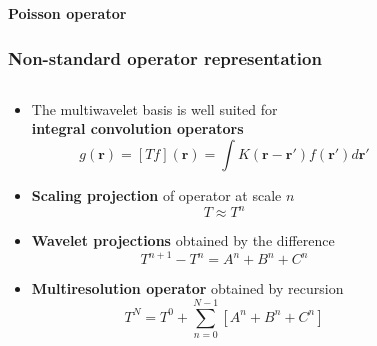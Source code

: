 \begin{frame}
    \centering
    \textbf{\Large{Poisson operator}}
\end{frame}

\begin{frame}
    \frametitle{Non-standard operator representation}
    \tiny
    \begin{columns}
    \begin{column}[b]{0.5\linewidth}
    \begin{itemize}
	\item	The multiwavelet basis is well suited for\\ 
        \textbf{integral convolution operators}
	    \begin{equation}
		\nonumber
		g(\boldsymbol{r}) = \left[T f\right](\boldsymbol{r}) = 
		    \int K(\boldsymbol{r} - \boldsymbol{r'})f(\boldsymbol{r'}) d\boldsymbol{r'}
	    \end{equation}\pause
	\item \textbf{Scaling projection} of operator at scale $n$
	    \begin{equation}
		\nonumber
		T \approx T^n
	    \end{equation}\pause
	\item \textbf{Wavelet projections} obtained by the difference
	    \begin{equation}
		\nonumber
		T^{n+1} - T^n = A^n + B^n + C^n
	    \end{equation}\pause\pause\pause\pause\pause
	\item \textbf{Multiresolution operator} obtained by recursion
	    \begin{equation}
		\nonumber
		T^N = T^0 + \sum_{n=0}^{N-1} \left[A^n + B^n + C^n\right]
	    \end{equation}\pause
    \end{itemize}
    \end{column}
    \begin{column}[b]{0.5\linewidth}
    \begin{center}
\end{center}
\end{column}
\end{columns}
\end{frame}
